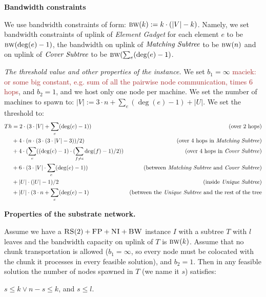 \documentclass[preprint,12pt]{elsarticle}
\newcommand{\maciek}[1]{\textcolor{brown}{maciek: #1}}
\newcommand{\CC}{\textsc{NI}}
\newcommand{\FP}{\textsc{FP}}
\newcommand{\RS}{\textsc{RS}}
\newcommand{\BW}{\textsc{BW}}
\newcommand{\numNodes}{\ensuremath{|V|}}
\newcommand{\UnqSubtree}{{{\emph{Unique Subtree}}}}
\newcommand{\MatchSubtree}{{\emph{Matching Subtree}}}
\newcommand{\CoverSubtree}{{\emph{Cover Subtree}}}
\newcommand{\ElGadget}{{\emph{Element Gadget}}}
\newcommand{\Band}{\textsc{bw}}
\newcommand{\CostTrans}{\ensuremath{b_1}}
\newcommand{\CostCom}{\ensuremath{b_2}}
\newcommand{\Thr}{\ensuremath{Th}}
\begin{document}
\noindent \textbf{Bandwidth constraints}

We use bandwidth constraints of form:
$\Band(k) := k\cdot(\numNodes - k)$. Namely, we set bandwidth
constraints of uplink of {\ElGadget} for each element $e$ to be
$\Band(\deg(e)-1)$, the bandwidth on uplink of $\MatchSubtree$ to be
$\Band(n)$ and on uplink of $\CoverSubtree$ to be
$\Band(\sum_e (\deg(e)-1)$.

\emph{The threshold value and other properties of the instance.}  We
set $\CostTrans = \infty$ \maciek{or some big constant, e.g. sum of
  all the pairwise node communication, times 6 hops}, and
$\CostCom = 1$, and we host only one node per machine. We set the
number of machines to spawn to:
$\numNodes := 3\cdot n + \sum_e (\deg(e)-1) + |U|$. We set the threshold to:
\begin{align*}
  \Thr  & = 2\cdot (3\cdot \numNodes + \sum_e (\deg(e) - 1)) & \mbox{(over 2 hops)}\\
        & + 4\cdot (n\cdot (3 \cdot (3\cdot \numNodes - 3)) / 2) & \mbox{(over 4 hops in {\MatchSubtree})}\\
        & + 4\cdot (\sum_e((\deg(e) - 1)\cdot (\sum_{f\neq e} \deg(f) - 1)/2)) & \mbox{(over 4 hops in {\CoverSubtree})}\\
        & + 6\cdot (3\cdot \numNodes \cdot \sum_e(\deg(e) - 1)) & \mbox{(between {\MatchSubtree} and {\CoverSubtree})} \\
        & + |U|\cdot (|U|-1)/2 & \mbox{(inside {\UnqSubtree})} \\
        & + |U| \cdot (3\cdot n + \sum_e (\deg(e)-1) & \mbox{(between the {\UnqSubtree} and the rest of the tree} \\
\end{align*}


\noindent \textbf{Properties of the substrate network.}

\begin{lemma}
  Assume we have a $\RS(2)+\FP+\CC+\BW$ instance $I$ with a subtree
  $T$ with $l$ leaves and the bandwidth capacity on uplink of $T$ is
  $\Band(k)$. Assume that no chunk transportation is allowed
  ($\CostTrans = \infty$, so every node must be colocated with the
  chunk it processes in every feasible solution), and $\CostCom = 1$.
  Then in any feasible solution the number of nodes spawned in $T$ (we
  name it $s$) satisfies:

  $s \leq k \vee n-s\leq k$, and $s \leq l$.
  \label{lem:bandwidth1}
\end{lemma}
\end{document}
